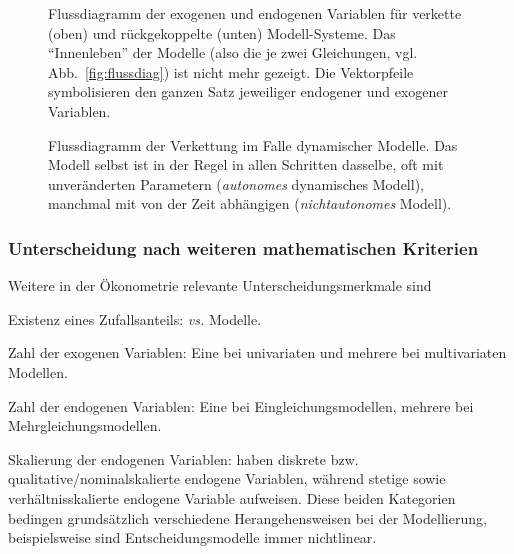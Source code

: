 \begin{figure}[t!]
\caption{\label{fig:flussdiag-Kopplungen}Flussdiagramm der exogenen und
endogenen Variablen f\"ur verkette (oben) und
r\"uckgekoppelte (unten) Modell-Systeme. Das
``Innenleben'' der Modelle (also die je zwei Gleichungen,
vgl. Abb.~\ref{fig:flussdiag})  ist nicht
mehr gezeigt. Die Vektorpfeile symbolisieren den ganzen Satz
jeweiliger endogener und exogener Variablen.
}
\end{figure}


\begin{figure}[t!]
\caption{\label{fig:flussdiag-Zeitentwicklung}Flussdiagramm der
Verkettung im Falle dynamischer Modelle. Das Modell selbst ist in der
Regel in allen Schritten dasselbe, oft mit unver\"anderten Parametern
(\textit{autonomes} dynamisches Modell), manchmal mit von der Zeit
abh\"angigen (\textit{nichtautonomes} Modell).
}
\end{figure}

\subsubsection{Unterscheidung nach weiteren mathematischen Kriterien}

Weitere in der \"Okonometrie relevante Unterscheidungsmerkmale sind
\bi
\item Existenz eines Zufallsanteils: 
 \textit{vs.} 
Modelle. 

\item Zahl der exogenen Variablen:
Eine bei univariaten und mehrere bei multivariaten Modellen.

\item Zahl der endogenen Variablen: Eine bei
Eingleichungsmodellen, mehrere bei Mehrgleichungsmodellen.

\item Skalierung der endogenen Variablen:
 haben diskrete
bzw. qualitative/nominalskalierte endogene Variablen, w\"ahrend
 stetige sowie verh\"altnisskalierte
 endogene Variable aufweisen. Diese beiden Kategorien bedingen
grunds\"atzlich verschiedene Herangehensweisen bei der Modellierung,
beispielsweise sind Entscheidungsmodelle immer nichtlinear.
 
